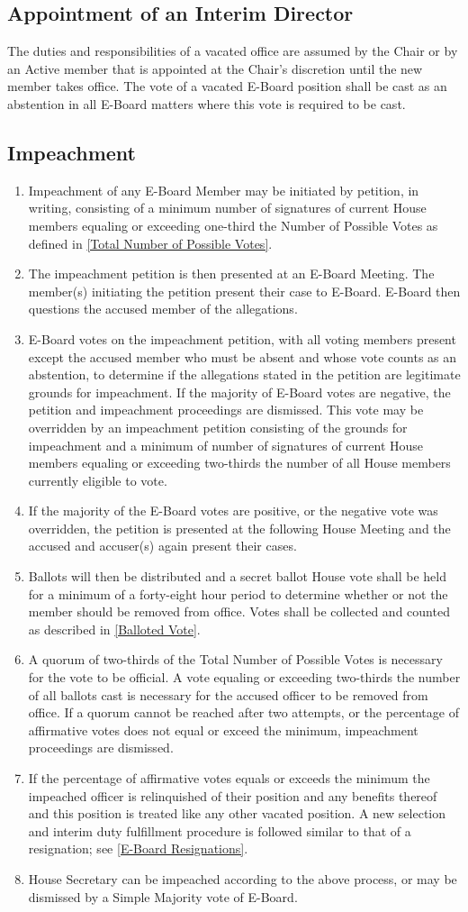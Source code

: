 \documentclass{article}
\newcommand{\asection}[1]{\subsection{#1} \label{#1}}
\begin{document}
\asection{Appointment of an Interim Director}
The duties and responsibilities of a vacated office are assumed by the Chair or by an Active member that is appointed at the Chair's discretion until the new member takes office.
The vote of a vacated E-Board position shall be cast as an abstention in all E-Board matters where this vote is required to be cast.

\asection{Impeachment}
\begin{enumerate}
	\item Impeachment of any E-Board Member may be initiated by petition, in writing, consisting of a minimum number of signatures of current House members equaling or exceeding one-third the Number of Possible Votes as defined in \ref{Total Number of Possible Votes}.
	\item The impeachment petition is then presented at an E-Board Meeting.
		The member(s) initiating the petition present their case to E-Board.
		E-Board then questions the accused member of the allegations.
	\item E-Board votes on the impeachment petition, with all voting members present except the accused member who must be absent and whose vote counts as an abstention, to determine if the allegations stated in the petition are legitimate grounds for impeachment.
		If the majority of E-Board votes are negative, the petition and impeachment proceedings are dismissed.
		This vote may be overridden by an impeachment petition consisting of the grounds for impeachment and a minimum of number of signatures of current House members equaling or exceeding two-thirds the number of all House members currently eligible to vote.
	\item If the majority of the E-Board votes are positive, or the negative vote was overridden, the petition is presented at the following House Meeting and the accused and accuser(s) again present their cases.
	\item Ballots will then be distributed and a secret ballot House vote shall be held for a minimum of a forty-eight hour period to determine whether or not the member should be removed from office.
		Votes shall be collected and counted as described in \ref{Balloted Vote}.
	\item A quorum of two-thirds of the Total Number of Possible Votes is necessary for the vote to be official.
		A vote equaling or exceeding two-thirds the number of all ballots cast is necessary for the accused officer to be removed from office.
		If a quorum cannot be reached after two attempts, or the percentage of affirmative votes does not equal or exceed the minimum, impeachment proceedings are dismissed.
	\item If the percentage of affirmative votes equals or exceeds the minimum the impeached officer is relinquished of their position and any benefits thereof and this position is treated like any other vacated position.
		A new selection and interim duty fulfillment procedure is followed similar to that of a resignation; see \ref{E-Board Resignations}.
	\item House Secretary can be impeached according to the above process, or may be dismissed by a Simple Majority vote of E-Board.
\end{enumerate}
\end{document}
